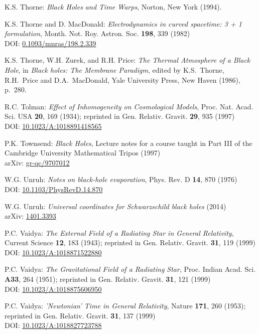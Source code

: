 \begin{thebibliography}{123}
K.S. Thorne:
{\em Black Holes and Time Warps},
Norton, New York (1994).

K.S. Thorne and D. MacDonald:
{\em Electrodynamics in curved spacetime: 3 + 1 formulation},
Month. Not. Roy. Astron. Soc. {\bf 198}, 339 (1982)\\
DOI: \href{https://doi.org/10.1093/mnras/198.2.339}{0.1093/mnras/198.2.339}

K.S. Thorne, W.H. Zurek, and R.H. Price:
{\em The Thermal Atmosphere of a Black Hole},
in {\em Black holes: The Membrane Paradigm},
edited by  K.S.~Thorne, R.H.~Price and D.A.~MacDonald,
Yale University Press, New Haven (1986), p.~280.

R.C. Tolman:
{\em Effect of Inhomogeneity on Cosmological Models},
Proc. Nat. Acad. Sci. USA {\bf 20}, 169 (1934);
reprinted in Gen. Relativ. Gravit. {\bf 29}, 935 (1997)\\
DOI: \href{https://doi.org/10.1023/A:1018891418565}{10.1023/A:1018891418565}

P.K. Townsend: {\em Black Holes}, Lecture notes for a course taught in Part III
of the Cambridge University Mathematical Tripos (1997)\\
arXiv: \href{https://arxiv.org/abs/gr-qc/9707012}{gr-qc/9707012}

W.G. Unruh: {\em Notes on black-hole evaporation},
Phys. Rev. D {\bf 14}, 870 (1976)\\
DOI: \href{https://doi.org/10.1103/PhysRevD.14.870}{10.1103/PhysRevD.14.870}

W.G. Unruh: {\em Universal coordinates for Schwarzschild black holes} (2014)\\
arXiv: \href{https://arxiv.org/abs/1401.3393}{1401.3393}

P.C. Vaidya:
{\em The External Field of a Radiating Star in General Relativity},
Current Science {\bf 12}, 183 (1943);
reprinted in Gen. Relativ. Gravit. {\bf 31}, 119 (1999)\\
DOI: \href{https://doi.org/10.1023/A:1018871522880}{10.1023/A:1018871522880}

P.C. Vaidya:
{\em The Gravitational Field of a Radiating Star},
Proc. Indian Acad. Sci. {\bf A33}, 264 (1951);
reprinted in Gen. Relativ. Gravit. {\bf 31}, 121 (1999)\\
DOI: \href{https://doi.org/10.1023/A:1018875606950}{10.1023/A:1018875606950}

P.C. Vaidya:
{\em 'Newtonian' Time in General Relativity},
Nature {\bf 171}, 260 (1953);
reprinted in Gen. Relativ. Gravit. {\bf 31}, 137 (1999)\\
DOI: \href{https://doi.org/10.1023/A:1018827723788}{10.1023/A:1018827723788}


\end{thebibliography}
